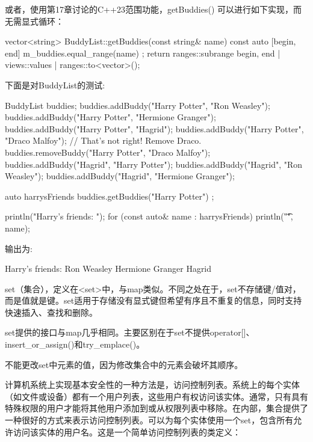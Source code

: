 或者，使用第17章讨论的C++23范围功能，getBuddies() 可以进行如下实现，而无需显式循环：

\begin{cpp}
vector<string> BuddyList::getBuddies(const string& name) const
{
    auto [begin, end] { m_buddies.equal_range(name) };
    return ranges::subrange { begin, end } | views::values | ranges::to<vector>();
}
\end{cpp}

下面是对BuddyList的测试:

\begin{cpp}
BuddyList buddies;
buddies.addBuddy("Harry Potter", "Ron Weasley");
buddies.addBuddy("Harry Potter", "Hermione Granger");
buddies.addBuddy("Harry Potter", "Hagrid");
buddies.addBuddy("Harry Potter", "Draco Malfoy");
// That's not right! Remove Draco.
buddies.removeBuddy("Harry Potter", "Draco Malfoy");
buddies.addBuddy("Hagrid", "Harry Potter");
buddies.addBuddy("Hagrid", "Ron Weasley");
buddies.addBuddy("Hagrid", "Hermione Granger");

auto harrysFriends { buddies.getBuddies("Harry Potter") };

println("Harry's friends: ");
for (const auto& name : harrysFriends) {
    println("\t{}", name);
}
\end{cpp}

输出为:

\begin{shell}
Harry's friends:
        Ron Weasley
        Hermione Granger
        Hagrid
\end{shell}


set（集合），定义在<set>中，与map类似。不同之处在于，set不存储键/值对，而是值就是键。set适用于存储没有显式键但希望有序且不重复的信息，同时支持快速插入、查找和删除。

set提供的接口与map几乎相同。主要区别在于set不提供operator[]、insert\_or\_assign()和try\_emplace()。

不能更改set中元素的值，因为修改集合中的元素会破坏其顺序。


计算机系统上实现基本安全性的一种方法是，访问控制列表。系统上的每个实体（如文件或设备）都有一个用户列表，这些用户有权访问该实体。通常，只有具有特殊权限的用户才能将其他用户添加到或从权限列表中移除。在内部，集合提供了一种很好的方式来表示访问控制列表。可以为每个实体使用一个set，包含所有允许访问该实体的用户名。这是一个简单访问控制列表的类定义：

